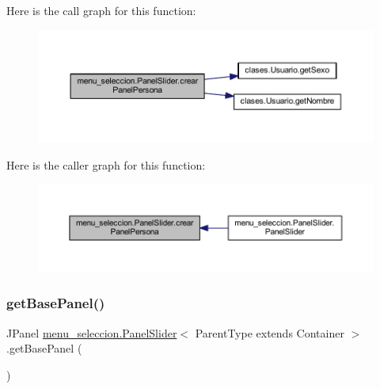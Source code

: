 Here is the call graph for this function\+:
\nopagebreak
\begin{figure}[H]
\begin{center}
\leavevmode
\includegraphics[width=350pt]{classmenu__seleccion_1_1_panel_slider_ac08af6fbde0b2c7dd9faadf96b2f42b9_cgraph}
\end{center}
\end{figure}
Here is the caller graph for this function\+:
\nopagebreak
\begin{figure}[H]
\begin{center}
\leavevmode
\includegraphics[width=350pt]{classmenu__seleccion_1_1_panel_slider_ac08af6fbde0b2c7dd9faadf96b2f42b9_icgraph}
\end{center}
\end{figure}
\mbox{\label{classmenu__seleccion_1_1_panel_slider_a1eb5380941a00a4cfac9d1ebb9d9fc6e}} 
\subsubsection{\texorpdfstring{get\+Base\+Panel()}{getBasePanel()}}
{\footnotesize\ttfamily J\+Panel \mbox{\hyperlink{classmenu__seleccion_1_1_panel_slider}{menu\+\_\+seleccion.\+Panel\+Slider}}$<$ Parent\+Type extends Container $>$.get\+Base\+Panel (\begin{DoxyParamCaption}{ }\end{DoxyParamCaption})}

